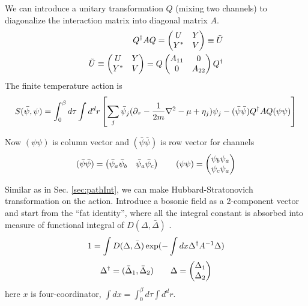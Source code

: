 We can introduce a unitary transformation $Q$ (mixing two channels) to diagonalize the interaction matrix into diagonal matrix $A$.
\begin{equation}
\begin{split}
Q^{\dagger}AQ=\begin{pmatrix}U&Y\\Y^{*}&V\end{pmatrix}\equiv{}\tilde{U}\\
\tilde{U}\equiv\begin{pmatrix}U&Y\\Y^{*}&V\end{pmatrix}=Q\begin{pmatrix}A_{11}&0\\0&A_{22}\end{pmatrix}Q^{\dagger}
\end{split}
\end{equation}
The finite temperature action is 
\begin{equation}\label{eq:pathInt2:actionFermi}
S(\bar\psi,\psi)=\int^{\beta}_{0}d\tau\int{d^{d}r}\left[\sum_{j}\bar\psi_{j}(\partial_\tau-\frac{1}{2m}\nabla^{2}-\mu+\eta_{j})\psi_{j}
-(\bar\psi\bar\psi)Q^{\dagger}AQ(\psi\psi)\right]
\end{equation}

Now $(\psi\psi)$ is column vector and $(\bar\psi\bar\psi)$ is row vector for channels
\begin{equation*}
(\bar\psi\bar\psi)=\begin{pmatrix}\bar\psi_{a}\bar\psi_{b}&\bar\psi_{a}\bar\psi_{c}\end{pmatrix}
\qquad(\psi\psi)=\begin{pmatrix}\psi_{b}\psi_{a}\\\psi_{c}\psi_{a}\end{pmatrix}
\end{equation*}

Similar as in Sec. \ref{sec:pathInt}, we can make Hubbard-Stratonovich transformation on the action.   Introduce a bosonic field as a 2-component vector   and start from the ``fat identity'', where  all the integral constant is absorbed into measure of functional integral of $D(\Delta,\bar\Delta)$ \cite{Altland}.
\begin{equation}\label{eq:pathInt2:indetity}
1=\int{D(\Delta,\bar\Delta)}\exp(-\int{dx}\Delta^{\dagger}A^{-1}\Delta)
\end{equation}
\[
\Delta^{\dagger}=(\bar\Delta_{1},\bar\Delta_{2})\qquad\Delta=\begin{pmatrix}\Delta_{1}\\\Delta_{2}\end{pmatrix}
\]
here $x$ is four-coordinator,  $\int{dx}=\int^{\beta}_{0}d\tau\int{d^{d}r}$. 

